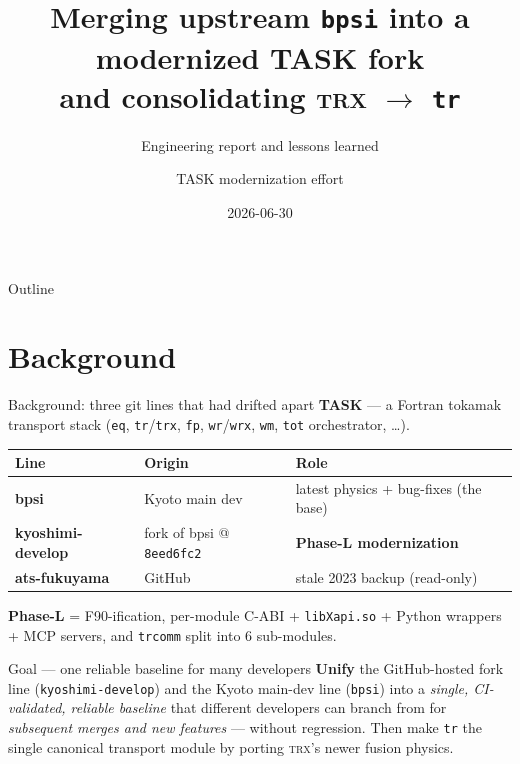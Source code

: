 \documentclass[10pt,aspectratio=169]{beamer}
\title[TASK merge \& TRX port]{Merging upstream \texttt{bpsi} into a modernized TASK fork\\
and consolidating \textsc{trx} $\to$ \texttt{tr}}
\subtitle{Engineering report and lessons learned}
\author{TASK modernization effort}
\institute[]{Plasma simulation stack --- P0 merge (delivered) + P1 fusion port (in progress)}
\date{2026-06-30}
\newcommand{\C}[1]{\texttt{\small #1}}          %
\begin{document}
\begin{frame}[plain]\titlepage\end{frame}

\begin{frame}{Outline}\tableofcontents\end{frame}

\section{Background}
\begin{frame}{Background: three git lines that had drifted apart}
\textbf{TASK} --- a Fortran tokamak transport stack (\C{eq}, \C{tr}/\C{trx},
\C{fp}, \C{wr}/\C{wrx}, \C{wm}, \C{tot} orchestrator, \dots).
\vspace{0.6em}
\begin{table}\footnotesize
\begin{tabular}{@{}lll@{}}
\toprule
Line & Origin & Role \\
\midrule
\textbf{bpsi} & Kyoto main dev & latest physics + bug-fixes (the base) \\
\textbf{kyoshimi-develop} & fork of bpsi @ \C{8eed6fc2} & \textbf{Phase-L modernization} \\
\textbf{ats-fukuyama} & GitHub & stale 2023 backup (read-only) \\
\bottomrule
\end{tabular}
\end{table}
\vspace{0.4em}
\textbf{Phase-L} = F90-ification, per-module C-ABI + \C{libXapi.so} + Python wrappers + MCP
servers, and \C{trcomm} split into 6 sub-modules.
\vspace{0.6em}

\begin{block}{Goal --- one reliable baseline for many developers}
\textbf{Unify} the GitHub-hosted fork line (\C{kyoshimi-develop}) and the Kyoto main-dev line (\C{bpsi}) into a
\emph{single, CI-validated, reliable baseline} that different developers can branch from for
\emph{subsequent merges and new features} --- without regression. Then make \C{tr} the single
canonical transport module by porting \textsc{trx}'s newer fusion physics.
\end{block}
\end{frame}

\end{document}
